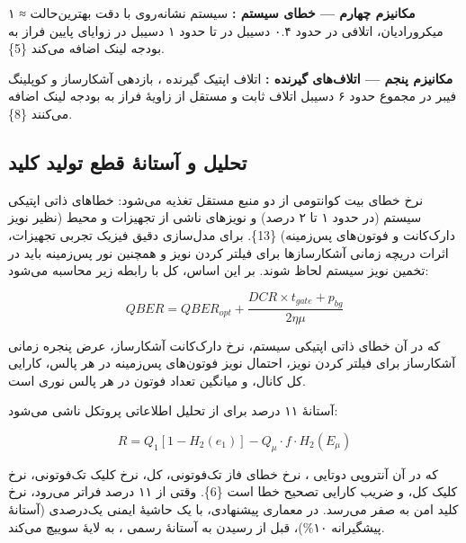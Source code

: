\documentclass[a4paper,14pt]{extreport}
\begin{document}
\textbf{مکانیزم چهارم --- خطای سیستم :} سیستم نشانه‌روی با دقت بهترین‌حالت ≈ ۱ میکرورادیان، اتلافی در حدود ۰.۴ دسیبل در  تا حدود ۱ دسیبل در زوایای پایین فراز به بودجه لینک اضافه می‌کند \{5\}.

\textbf{مکانیزم پنجم --- اتلاف‌های گیرنده :} اتلاف اپتیک گیرنده ، بازدهی آشکارساز  و کوپلینگ فیبر  در مجموع حدود ۶ دسیبل اتلاف ثابت و مستقل از زاویهٔ فراز به بودجه لینک اضافه می‌کنند \{8\}.
\subsection{تحلیل  و آستانهٔ قطع تولید کلید}

نرخ خطای بیت کوانتومی  از دو منبع مستقل تغذیه می‌شود: خطاهای ذاتی اپتیکی سیستم (در حدود ۱ تا ۲ درصد) و نویزهای ناشی از تجهیزات و محیط (نظیر نویز دارک‌کانت و فوتون‌های پس‌زمینه) \{13\}. برای مدل‌سازی دقیق فیزیک تجربی تجهیزات، اثرات دریچه زمانی  آشکارسازها برای فیلتر کردن نویز و همچنین نور پس‌زمینه  باید در تخمین نویز سیستم لحاظ شوند. بر این اساس،  کل با رابطه زیر محاسبه می‌شود:

\begin{equation}
QBER = QBER_{opt} + \frac{DCR \times t_{gate} + p_{bg}}{2 \eta \mu}
\label{eq:qber_noise}
\end{equation}

که در آن  خطای ذاتی اپتیکی سیستم،  نرخ دارک‌کانت  آشکارساز،  عرض پنجره زمانی آشکارساز برای فیلتر کردن نویز،  احتمال نویز فوتون‌های پس‌زمینه در هر پالس، \lr{$\eta$} کارایی کل کانال، و \lr{$\mu$} میانگین تعداد فوتون در هر پالس نوری  است.

آستانهٔ ۱۱ درصد برای  از تحلیل اطلاعاتی پروتکل  ناشی می‌شود:

\begin{equation}
R = Q_1\left[1 - H_2(e_1)\right] - Q_\mu \cdot f \cdot H_2(E_\mu)
\label{eq:bb84_rate}
\end{equation}

که در آن  آنتروپی دوتایی ،  نرخ خطای فاز تک‌فوتونی،   کل،  نرخ کلیک تک‌فوتونی،  نرخ کلیک کل، و  ضریب کارایی تصحیح خطا است \{6\}. وقتی  از ۱۱ درصد فراتر می‌رود، نرخ کلید امن به صفر می‌رسد. در معماری پیشنهادی،  با یک حاشیهٔ ایمنی یک‌درصدی (آستانهٔ پیشگیرانه ۱۰\%)، قبل از رسیدن به آستانهٔ رسمی ، به لایهٔ  سوییچ می‌کند.
\end{document}
